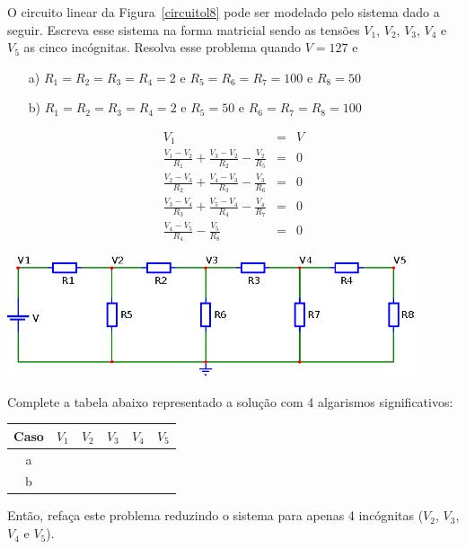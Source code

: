 \begin{exer}\label{prob_circuito_resistores}
O circuito linear da Figura~\ref{circuitol8} pode ser modelado pelo sistema dado a seguir. Escreva esse sistema na forma matricial sendo as tensões $V_1$, $V_2$, $V_3$, $V_4$ e $V_5$ as cinco incógnitas. Resolva esse problema quando $V=127$ e
\begin{itemize}
\item[a)] $R_1=R_2=R_3=R_4=2$ e $R_5=R_6=R_7=100$ e $R_8=50$
\item[b)] $R_1=R_2=R_3=R_4=2$ e $R_5=50$ e $R_6=R_7=R_8=100$
\end{itemize}

\begin{eqnarray}
V_1&=&V\\
\frac{V_1-V_2}{R_1}+\frac{V_3-V_2}{R_2}-\frac{V_2}{R_5}&=&0\\
\frac{V_2-V_3}{R_2}+\frac{V_4-V_3}{R_3}-\frac{V_3}{R_6}&=&0\\
\frac{V_3-V_4}{R_3}+\frac{V_5-V_4}{R_4}-\frac{V_4}{R_7}&=&0\\
\frac{V_4-V_5}{R_4}-\frac{V_5}{R_8}&=&0
\end{eqnarray}

\begin{center}
\includegraphics[width=12cm,angle=0]{./cap_linsis/pics/circuito_linear_8.eps}\label{circuitol8}
\end{center}

Complete a tabela abaixo representado a solução com 4 algarismos significativos:

\begin{center}
\begin{tabular}{|c|c|c|c|c|c|}
\hline
Caso & $V_1$ & $V_2$ & $V_3$ & $V_4$ & $V_5$\\
\hline
a & ~\hspace{40pt}~& ~\hspace{40pt}~& ~\hspace{40pt}~& ~\hspace{40pt}~& ~\hspace{40pt}~\\
\hline
b & & & & & \\
\hline
\end{tabular}
\end{center}

Então, refaça este problema reduzindo o sistema para apenas 4 incógnitas ($V_2$, $V_3$, $V_4$ e $V_5$).
\end{exer}
